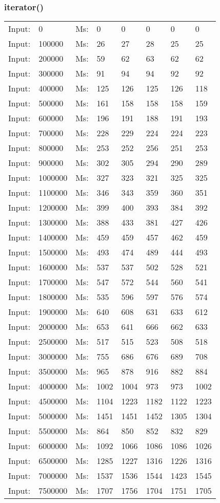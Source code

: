 \documentclass[11pt,a4paper]{report}
\begin{document}
\begin{tiny}
\subsubsection*{iterator()}
\begin{tabular}{l l ||l  l  l  l  l  l}
Input:&0&Ms:&0&0&0&0&0\\
Input:&100000&Ms:&26&27&28&25&25\\
Input:&200000&Ms:&59&62&63&62&62\\
Input:&300000&Ms:&91&94&94&92&92\\
Input:&400000&Ms:&125&126&125&126&118\\
Input:&500000&Ms:&161&158&158&158&159\\
Input:&600000&Ms:&196&191&188&191&193\\
Input:&700000&Ms:&228&229&224&224&223\\
Input:&800000&Ms:&253&252&256&251&253\\
Input:&900000&Ms:&302&305&294&290&289\\
Input:&1000000&Ms:&327&323&321&325&325\\
Input:&1100000&Ms:&346&343&359&360&351\\
Input:&1200000&Ms:&399&400&393&384&392\\
Input:&1300000&Ms:&388&433&381&427&426\\
Input:&1400000&Ms:&459&459&457&462&459\\
Input:&1500000&Ms:&493&474&489&444&493\\
Input:&1600000&Ms:&537&537&502&528&521\\
Input:&1700000&Ms:&547&572&544&560&541\\
Input:&1800000&Ms:&535&596&597&576&574\\
Input:&1900000&Ms:&640&608&631&633&612\\
Input:&2000000&Ms:&653&641&666&662&633\\
Input:&2500000&Ms:&517&515&523&508&518\\
Input:&3000000&Ms:&755&686&676&689&708\\
Input:&3500000&Ms:&965&878&916&882&884\\
Input:&4000000&Ms:&1002&1004&973&973&1002\\
Input:&4500000&Ms:&1104&1223&1182&1122&1223\\
Input:&5000000&Ms:&1451&1451&1452&1305&1304\\
Input:&5500000&Ms:&864&850&852&832&829\\
Input:&6000000&Ms:&1092&1066&1086&1086&1026\\
Input:&6500000&Ms:&1285&1227&1316&1226&1316\\
Input:&7000000&Ms:&1537&1536&1544&1423&1545\\
Input:&7500000&Ms:&1707&1756&1704&1751&1705\\
\end{tabular}
\\

\end{tiny}
\end{document}
